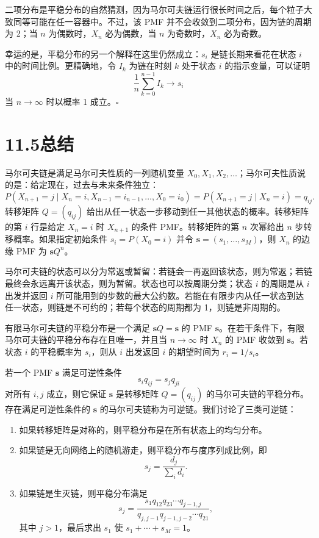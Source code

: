 \documentclass[UTF8,12pt,a4paper,fontset=fandol]{ctexart}
\begin{document}
二项分布是平稳分布的自然猜测，因为马尔可夫链运行很长时间之后，每个粒子大致同等可能在任一容器中。不过，该 PMF 并不会收敛到二项分布，因为链的周期为 2；当 $n$ 为偶数时，$X_n$ 必为偶数，当 $n$ 为奇数时，$X_n$ 必为奇数。

幸运的是，平稳分布的另一个解释在这里仍然成立：$s_i$ 是链长期来看花在状态 $i$ 中的时间比例。更精确地，令 $I_k$ 为链在时刻 $k$ 处于状态 $i$ 的指示变量，可以证明
\[
  \frac1n\sum_{k=0}^{n-1}I_k\to s_i
\]
当 $n\to\infty$ 时以概率 1 成立。$\square$

\section*{11.5\quad 总结}

马尔可夫链是满足马尔可夫性质的一列随机变量 $X_0,X_1,X_2,\ldots$；马尔可夫性质说的是：给定现在，过去与未来条件独立：
\[
  P(X_{n+1}=j\mid X_n=i,X_{n-1}=i_{n-1},\ldots,X_0=i_0)
  =
  P(X_{n+1}=j\mid X_n=i)
  =
  q_{ij}.
\]
转移矩阵 $Q=(q_{ij})$ 给出从任一状态一步移动到任一其他状态的概率。转移矩阵的第 $i$ 行是给定 $X_n=i$ 时 $X_{n+1}$ 的条件 PMF。转移矩阵的第 $n$ 次幂给出 $n$ 步转移概率。如果指定初始条件 $s_i=P(X_0=i)$ 并令 $\mathbf s=(s_1,\ldots,s_M)$，则 $X_n$ 的边缘 PMF 为 $\mathbf sQ^n$。

马尔可夫链的状态可以分为常返或暂留：若链会一再返回该状态，则为常返；若链最终会永远离开该状态，则为暂留。状态也可以按周期分类；状态 $i$ 的周期是从 $i$ 出发并返回 $i$ 所可能用到的步数的最大公约数。若能在有限步内从任一状态到达任一状态，则链是不可约的；若每个状态的周期都为 1，则链是非周期的。

有限马尔可夫链的平稳分布是一个满足 $\mathbf sQ=\mathbf s$ 的 PMF $\mathbf s$。在若干条件下，有限马尔可夫链的平稳分布存在且唯一，并且当 $n\to\infty$ 时 $X_n$ 的 PMF 收敛到 $\mathbf s$。若状态 $i$ 的平稳概率为 $s_i$，则从 $i$ 出发返回 $i$ 的期望时间为 $r_i=1/s_i$。

若一个 PMF $\mathbf s$ 满足可逆性条件
\[
  s_iq_{ij}=s_jq_{ji}
\]
对所有 $i,j$ 成立，则它保证 $\mathbf s$ 是转移矩阵 $Q=(q_{ij})$ 的马尔可夫链的平稳分布。存在满足可逆性条件的 $\mathbf s$ 的马尔可夫链称为可逆链。我们讨论了三类可逆链：

\begin{enumerate}
\item 如果转移矩阵是对称的，则平稳分布是在所有状态上的均匀分布。
\item 如果链是无向网络上的随机游走，则平稳分布与度序列成比例，即
\[
  s_j=\frac{d_j}{\sum_i d_i}.
\]
\item 如果链是生灭链，则平稳分布满足
\[
  s_j=\frac{s_1q_{12}q_{23}\cdots q_{j-1,j}}
  {q_{j,j-1}q_{j-1,j-2}\cdots q_{21}},
\]
其中 $j>1$，最后求出 $s_1$ 使 $s_1+\cdots+s_M=1$。
\end{enumerate}
\end{document}
